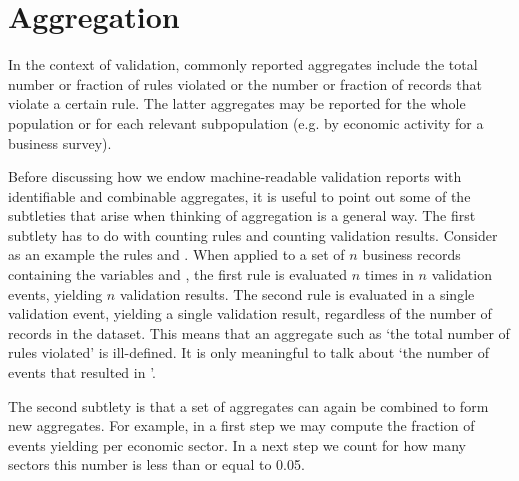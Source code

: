\section{Aggregation}
In the context of validation, commonly reported aggregates include the total
number or fraction of rules violated or the number or fraction of records  that
violate a certain rule. The latter aggregates may be reported for the whole
population or for each relevant subpopulation (e.g. by economic activity for a
business survey). 


Before discussing how we endow machine-readable validation reports with
identifiable and combinable aggregates, it is useful to point out some of the
subtleties that arise when thinking of aggregation is a general way. The first
subtlety has to do with counting rules and counting validation results.
Consider as an example the rules  and .  When applied to a set of $n$ business records containing the variables
 and , the first rule is evaluated $n$ times in $n$
validation events, yielding $n$ validation results. The second rule is
evaluated in a single validation event, yielding a single validation result,
regardless of the number of records in the dataset. This means that an
aggregate such as `the total number of rules violated' is ill-defined. It is
only meaningful to talk about `the number of events that resulted in
\onwaar{}'. 

The second subtlety is that a set of aggregates can again be combined to form
new aggregates. For example, in a first step we may compute the fraction of
events yielding \onwaar{} per economic sector. In a next step we count for how
many sectors this number is less than or equal to 0.05.


